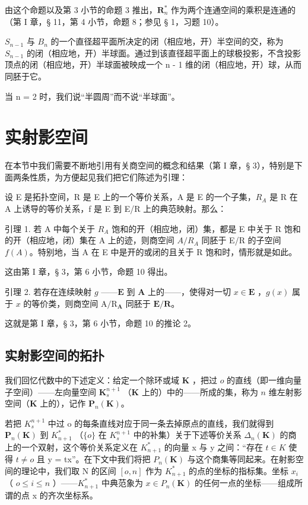 由这个命题以及第 3 小节的命题 3 推出，\(\mathbf{R}_n^*\) 作为两个连通空间的乘积是连通的（第 I 章，§ 11，第 4 小节，命题 8；参见 § 1，习题 10）。

\(S_{n-1}\) 与 \(B_{n}\) 的一个直径超平面所决定的闭（相应地，开）半空间的交，称为 \(S_{n-1}\) 的闭（相应地，开）半球面。通过到该直径超平面上的球极投影，不含投影顶点的闭（相应地，开）半球面被映成一个 n - 1 维的闭（相应地，开）球，从而同胚于它。

当 n = 2 时，我们说“半圆周”而不说“半球面”。

\section{实射影空间}

在本节中我们需要不断地引用有关商空间的概念和结果（第 I 章，§ 3），特别是下面两条性质，为方便起见我们把它们陈述为引理：

设 E 是拓扑空间，R 是 E 上的一个等价关系，A 是 E 的一个子集，\(R_{A}\) 是 R 在 A 上诱导的等价关系，f 是 E 到 E/R 上的典范映射。那么：

引理 1. 若 A 中每个关于 \(R_{A}\) 饱和的开（相应地，闭）集，都是 E 中关于 R 饱和的开（相应地，闭）集在 A 上的迹，则商空间 \(A/R_{A}\) 同胚于 E/R 的子空间 \(f(A)\)。特别地，当 A 在 E 中是开的或闭的且关于 R 饱和时，情形就是如此。

这由第 I 章，§ 3，第 6 小节，命题 10 得出。

引理 2. 若存在连续映射 \(g\) ——\(\mathbf{E}\) 到 \(\mathbf{A}\) 上的——，使得对一切 \(x \in \mathbf{E}\) ，\(g(x)\) 属于 \(x\) 的等价类，则商空间 \(\mathrm{A} / \mathrm{R}_{\mathbf{A}}\) 同胚于 \(\mathbf{E} / \mathbf{R}\)。

这就是第 I 章，§ 3，第 6 小节，命题 10 的推论 2。

\subsection{实射影空间的拓扑}

我们回忆代数中的下述定义：给定一个除环或域 \(\mathbf{K}\) ，把过 \(o\) 的直线（即一维向量子空间）——左向量空间 \(\mathbf{K}_s^{n+1}\) （\(\mathbf{K}\) 上的）中的——所成的集，称为 \(n\) 维左射影空间（\(\mathbf{K}\) 上的），记作 \(\mathbf{P}_n(\mathbf{K})\)。

若把 \(K_{s}^{n+1}\) 中过 o 的每条直线对应于同一条去掉原点的直线，我们就得到 \(\mathbf{P}_{n}(\mathbf{K})\) 到 \(K_{n+1}^{*}\) （\(\{o\}\) 在 \(K_{s}^{n+1}\) 中的补集）关于下述等价关系 \(\Delta_{n}(\mathbf{K})\) 的商上的一个双射，这个等价关系定义在 \(K_{n+1}^{*}\) 的向量 x 与 y 之间：“存在 \(t \in K\) 使得 \(t \neq o\) 且 y = tx”。在下文中我们将把 \(P_{n}(\mathbf{K})\) 与这个商集等同起来。在射影空间的理论中，我们取 N 的区间 \([o, n]\) 作为 \(K_{n+1}^{*}\) 的点的坐标的指标集。坐标 \(x_{i}\) （ \(o \leqslant i \leqslant n\) ）——\(K_{n+1}^{*}\) 中典范象为 \(x \in P_{n}(\mathbf{K})\) 的任何一点的坐标——组成所谓的点 x 的齐次坐标系。


